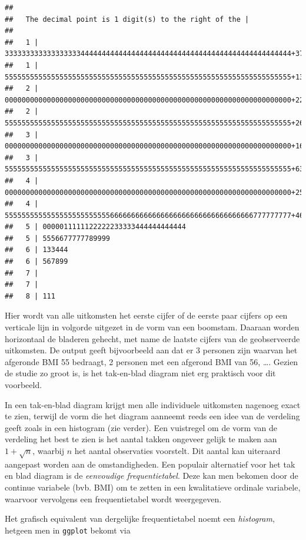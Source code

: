 \documentclass[
  12pt,dutch,coursenotes]{book}
\newcommand{\passthrough}[1]{#1}
\begin{document}
\begin{lstlisting}
## 
##   The decimal point is 1 digit(s) to the right of the |
## 
##   1 | 33333333333333333344444444444444444444444444444444444444444444444444+37
##   1 | 55555555555555555555555555555555555555555555555555555555555555555555+1389
##   2 | 00000000000000000000000000000000000000000000000000000000000000000000+2264
##   2 | 55555555555555555555555555555555555555555555555555555555555555555555+2610
##   3 | 00000000000000000000000000000000000000000000000000000000000000000000+1693
##   3 | 55555555555555555555555555555555555555555555555555555555555555555555+635
##   4 | 00000000000000000000000000000000000000000000000000000000000000000000+255
##   4 | 55555555555555555555555556666666666666666666666666666666666777777777+46
##   5 | 0000011111122222233333444444444444
##   5 | 5556677777789999
##   6 | 133444
##   6 | 567899
##   7 | 
##   7 | 
##   8 | 111
\end{lstlisting}

Hier wordt van alle uitkomsten het eerste cijfer of de eerste paar cijfers
op een verticale lijn in volgorde uitgezet in de vorm van een boomstam.
Daaraan worden horizontaal de bladeren gehecht, met name de laatste cijfers
van de geobserveerde uitkomsten. De output geeft bijvoorbeeld aan dat er 3 personen zijn waarvan het afgeronde BMI 55 bedraagt, 2 personen met een afgerond BMI van 56, \ldots.
Gezien de studie zo groot is, is het tak-en-blad diagram niet erg praktisch voor dit voorbeeld.

In een tak-en-blad diagram krijgt men alle individuele uitkomsten nagenoeg
exact te zien, terwijl de vorm die het diagram aanneemt reeds een idee van
de verdeling geeft zoals in een histogram (zie verder). Een vuistregel om de
vorm van de verdeling het best te zien is het aantal takken ongeveer gelijk
te maken aan \(1 + \sqrt{n}\), waarbij \(n\) het aantal observaties voorstelt.
Dit aantal kan uiteraard aangepast worden aan de omstandigheden.
Een populair alternatief voor het tak en blad diagram is de \emph{eenvoudige frequentietabel}. Deze kan men bekomen door de continue variabele (bvb. BMI) om te zetten in een kwalitatieve ordinale variabele, waarvoor vervolgens een frequentietabel wordt weergegeven.

Het grafisch equivalent van dergelijke frequentietabel noemt een \emph{histogram}, hetgeen men in \passthrough{\lstinline!ggplot!} bekomt via
\end{document}
